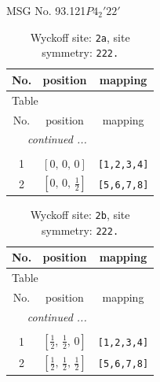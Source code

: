 \documentclass[fleqn,8pt]{jsarticle}
\begin{document}
\setcounter{MaxMatrixCols}{32}

\renewcommand{\tablename}{Table~}
\renewcommand{\figurename}{Figure~}
\begin{center}
\LARGE
MSG No. 93.121\quad$P4_{2}'22'$
\end{center}
\renewcommand{\arraystretch}{1.2}
\begin{longtable}{ccc}
\caption{Wyckoff site: {\tt 2a}, site symmetry: {\tt 222.}}
 \\
 \hline \hline
No. & position & mapping \\ \hline \endfirsthead

\multicolumn{2}{l}{\tablename\ \thetable{}} \\
 \hline \hline
No. & position & mapping \\ \hline \endhead

 \hline \hline
\multicolumn{2}{r}{\footnotesize\it continued ...} \\ \endfoot

 \hline \hline
\multicolumn{2}{r}{} \\ \endlastfoot

1 & $\left[ 0,\, 0,\, 0 \right]$ & {\tt [1,2,3,4]} \\ \hline
2 & $\left[ 0,\, 0,\, \frac{1}{2} \right]$ & {\tt [5,6,7,8]} \\
\end{longtable}
\renewcommand{\arraystretch}{1.2}
\begin{longtable}{ccc}
\caption{Wyckoff site: {\tt 2b}, site symmetry: {\tt 222.}}
 \\
 \hline \hline
No. & position & mapping \\ \hline \endfirsthead

\multicolumn{2}{l}{\tablename\ \thetable{}} \\
 \hline \hline
No. & position & mapping \\ \hline \endhead

 \hline \hline
\multicolumn{2}{r}{\footnotesize\it continued ...} \\ \endfoot

 \hline \hline
\multicolumn{2}{r}{} \\ \endlastfoot

1 & $\left[ \frac{1}{2},\, \frac{1}{2},\, 0 \right]$ & {\tt [1,2,3,4]} \\ \hline
2 & $\left[ \frac{1}{2},\, \frac{1}{2},\, \frac{1}{2} \right]$ & {\tt [5,6,7,8]} \\
\end{longtable}
\end{document}
